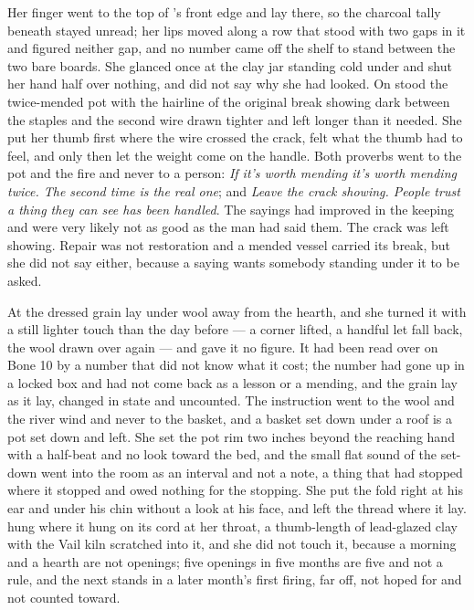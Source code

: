 Her finger went to the top of 's front edge and lay there, so the charcoal tally beneath stayed unread; her lips moved along a row that stood with two gaps in it and figured neither gap, and no number came off the shelf to stand between the two bare boards. She glanced once at the clay jar standing cold under  and shut her hand half over nothing, and did not say why she had looked. On  stood the twice-mended pot with the hairline of the original break showing dark between the staples and the second wire drawn tighter and left longer than it needed. She put her thumb first where the wire crossed the crack, felt what the thumb had to feel, and only then let the weight come on the handle. Both proverbs went to the pot and the fire and never to a person: \emph{If it's worth mending it's worth mending twice. The second time is the real one}; and \emph{Leave the crack showing. People trust a thing they can see has been handled}. The sayings had improved in the keeping and were very likely not as good as the man had said them. The crack was left showing. Repair was not restoration and a mended vessel carried its break, but she did not say either, because a saying wants somebody standing under it to be asked.

At  the dressed grain lay under wool away from the hearth, and she turned it with a still lighter touch than the day before --- a corner lifted, a handful let fall back, the wool drawn over again --- and gave it no figure. It had been read over on Bone 10 by a number that did not know what it cost; the number had gone up  in a locked box and had not come back as a lesson or a mending, and the grain lay as it lay, changed in state and uncounted. The instruction went to the wool and the river wind and never to the basket, and a basket set down under a roof is a pot set down and left. She set the pot rim two inches beyond the reaching hand with a half-beat and no look toward the bed, and the small flat sound of the set-down went into the room as an interval and not a note, a thing that had stopped where it stopped and owed nothing for the stopping. She put the fold right at his ear and under his chin without a look at his face, and left the thread where it lay.  hung where it hung on its cord at her throat, a thumb-length of lead-glazed clay with the Vail kiln scratched into it, and she did not touch it, because a morning and a hearth are not openings; five openings in five months are five and not a rule, and the next stands in a later month's first firing, far off, not hoped for and not counted toward.

